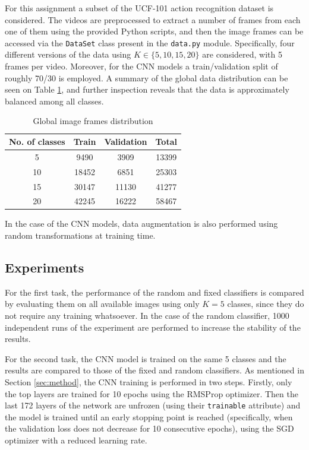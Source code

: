 \documentclass[letterpaper, 10 pt, conference]{IEEEtran}
\begin{document}
For this assignment a subset of the UCF-101 action recognition dataset \cite{ucf} is considered. The videos are preprocessed to extract a number of frames from each one of them using the provided Python scripts, and then the image frames can be accessed via the \texttt{DataSet} class present in the \texttt{data.py} module. Specifically, four different versions of the data using $K\in\{5,10,15,20\}$ are considered, with 5 frames per video. Moreover, for the CNN models a train/validation split of roughly 70/30 is employed. A summary of the global data distribution can be seen on Table \ref{tab:data}, and further inspection reveals that the data is approximately balanced among all classes.

\begin{table}[h!]
  \centering
  \begin{tabular}{c|ccc}
    No. of classes & Train & Validation & Total\\
    \hline
    5 & 9490 & 3909 & 13399\\
    10 & 18452 & 6851 & 25303\\
    15 & 30147 & 11130 & 41277\\
    20 & 42245 & 16222 & 58467
  \end{tabular}\vspace{1em}
  \caption{Global image frames distribution}
  \label{tab:data}
\end{table}

In the case of the CNN models, data augmentation is also performed using random transformations at training time.

\subsection{Experiments}
\label{subsec:experiments}

For the first task, the performance of the random and fixed classifiers is compared by evaluating them on all available images using only $K=5$ classes, since they do not require any training whatsoever. In the case of the random classifier, 1000 independent runs of the experiment are performed to increase the stability of the results.

For the second task, the CNN model is trained on the same 5 classes and the results are compared to those of the fixed and random classifiers. As mentioned in Section \ref{sec:method}, the CNN training is performed in two steps. Firstly, only the top layers are trained for 10 epochs using the RMSProp optimizer. Then the last 172 layers of the network are unfrozen (using their \texttt{trainable} attribute) and the model is trained until an early stopping point is reached (specifically, when the validation loss does not decrease for 10 consecutive epochs), using the SGD optimizer with a reduced learning rate.
\end{document}
